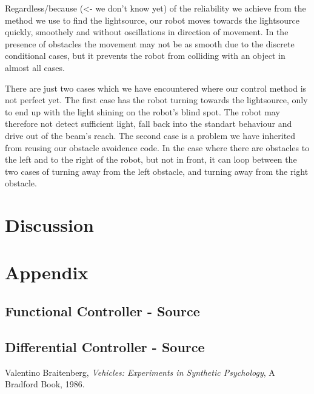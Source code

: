 \documentclass[paper=a4, fontsize=12pt]{scrartcl}	%
\numberwithin{equation}{section}		%
\numberwithin{figure}{section}			%
\numberwithin{table}{section}				%
\begin{document}
Regardless/because (<- we don't know yet) of the reliability we achieve from the method we use to find the lightsource, our robot moves towards the lightsource quickly, smoothely and without oscillations in direction of movement. In the presence of obstacles the movement may not be as smooth due to the discrete conditional cases, but it prevents the robot from colliding with an object in almost all cases.

There are just two cases which we have encountered where our control method is not perfect yet. The first case has the robot turning towards the lightsource, only to end up with the light shining on the robot's blind spot. The robot may therefore not detect sufficient light, fall back into the standart behaviour and drive out of the beam's reach. The second case is a problem we have inherited from reusing our obstacle avoidence code. In the case where there are obstacles to the left and to the right of the robot, but not in front, it can loop between the two cases of turning away from the left obstacle, and turning away from the right obstacle.
\section{Discussion}


\section{Appendix}
\subsection{Functional Controller - Source}

\subsection{Differential Controller - Source}

\begin{thebibliography}{9}
  Valentino Braitenberg,
  \emph{Vehicles: Experiments in Synthetic Psychology},
  A Bradford Book,
  1986.
\end{thebibliography}

\end{document}
